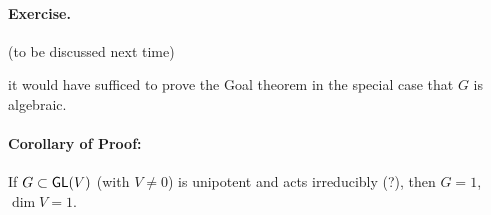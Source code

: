 \paragraph{Exercise.} (to be discussed next time)

it would have sufficed to prove the Goal theorem in the special case that $G$ is algebraic.


\paragraph{Corollary of Proof:} If $G \subset \textsf{GL}(V)$ (with $V \neq 0$) is unipotent and acts irreducibly (?), then $G = 1$, $\dim V = 1$.

